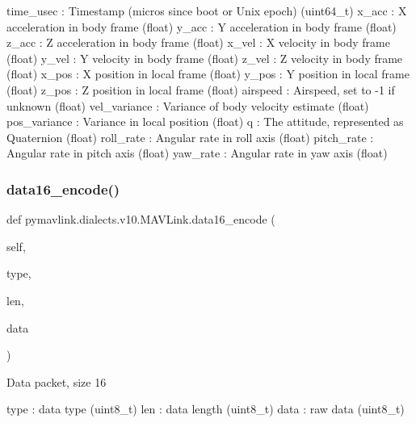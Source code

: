 \begin{DoxyVerb}
\begin{DoxyVerb}
\begin{DoxyVerb}
time_usec                 : Timestamp (micros since boot or Unix epoch) (uint64_t)
x_acc                     : X acceleration in body frame (float)
y_acc                     : Y acceleration in body frame (float)
z_acc                     : Z acceleration in body frame (float)
x_vel                     : X velocity in body frame (float)
y_vel                     : Y velocity in body frame (float)
z_vel                     : Z velocity in body frame (float)
x_pos                     : X position in local frame (float)
y_pos                     : Y position in local frame (float)
z_pos                     : Z position in local frame (float)
airspeed                  : Airspeed, set to -1 if unknown (float)
vel_variance              : Variance of body velocity estimate (float)
pos_variance              : Variance in local position (float)
q                         : The attitude, represented as Quaternion (float)
roll_rate                 : Angular rate in roll axis (float)
pitch_rate                : Angular rate in pitch axis (float)
yaw_rate                  : Angular rate in yaw axis (float)\end{DoxyVerb}
 \mbox{\label{classpymavlink_1_1dialects_1_1v10_1_1MAVLink_ad87c6a1df4653a52a2e2b5770ade7fdf}} 
\subsubsection{\texorpdfstring{data16\+\_\+encode()}{data16\_encode()}}
{\footnotesize\ttfamily def pymavlink.\+dialects.\+v10.\+M\+A\+V\+Link.\+data16\+\_\+encode (\begin{DoxyParamCaption}\item[{}]{self,  }\item[{}]{type,  }\item[{}]{len,  }\item[{}]{data }\end{DoxyParamCaption})}

\begin{DoxyVerb}Data packet, size 16

type                      : data type (uint8_t)
len                       : data length (uint8_t)
data                      : raw data (uint8_t)\end{DoxyVerb}
 \mbox{\label{classpymavlink_1_1dialects_1_1v10_1_1MAVLink_a6faf14de97635382c16aa181fcf9a277}} 

\end{DoxyVerb}
\end{DoxyVerb}
